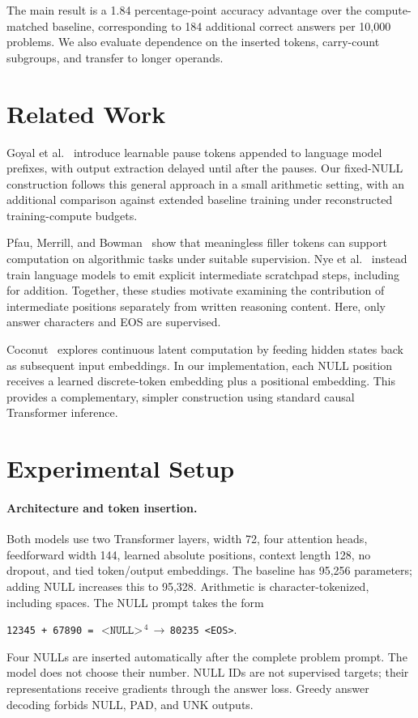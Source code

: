 \documentclass[10pt,twocolumn,letterpaper]{article}
\newcommand{\nulltok}{\texttt{<NULL>}}
\begin{document}
The main result is a 1.84 percentage-point accuracy advantage over the
compute-matched baseline, corresponding to 184 additional correct answers
per 10,000 problems. We also evaluate dependence on the inserted tokens,
carry-count subgroups, and transfer to longer operands.

\section{Related Work}
Goyal et al.~\cite{goyal} introduce learnable pause tokens appended to language
model prefixes, with output extraction delayed until after the pauses.
Our fixed-NULL construction follows this general approach in a small arithmetic
setting, with an additional comparison against extended baseline training
under reconstructed training-compute budgets.

Pfau, Merrill, and Bowman~\cite{pfau} show that meaningless filler tokens can
support computation on algorithmic tasks under suitable supervision. Nye et
al.~\cite{nye} instead train language models to emit explicit intermediate
scratchpad steps, including for addition. Together, these studies motivate
examining the contribution of intermediate positions separately from written
reasoning content. Here, only answer characters and EOS are supervised.

Coconut~\cite{hao} explores continuous latent computation by feeding hidden
states back as subsequent input embeddings. In our implementation, each NULL
position receives a learned discrete-token embedding plus a positional
embedding. This provides a complementary, simpler construction using standard
causal Transformer inference.

\section{Experimental Setup}
\paragraph{Architecture and token insertion.}
Both models use two Transformer layers, width 72, four attention heads,
feedforward width 144, learned absolute positions, context length 128, no
dropout, and tied token/output embeddings. The baseline has 95,256 parameters;
adding NULL increases this to 95,328. Arithmetic is character-tokenized,
including spaces. The NULL prompt takes the form
\begin{center}\small
\texttt{12345 + 67890 = }\,$\nulltok^{\,4}$\,$\rightarrow$\,\texttt{80235 <EOS>}.
\end{center}
Four NULLs are inserted automatically after the complete problem prompt.
The model does not choose their number. NULL IDs are not supervised targets;
their representations receive gradients through the answer loss. Greedy
answer decoding forbids NULL, PAD, and UNK outputs.
\end{document}
